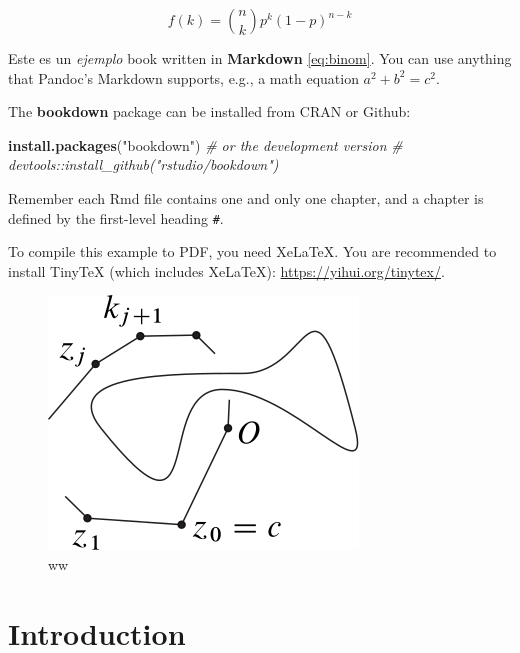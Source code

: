 \documentclass[12pt,]{book}
\newenvironment{Shaded}{\begin{snugshade}}{\end{snugshade}}
\newcommand{\CommentTok}[1]{\textcolor[rgb]{0.56,0.35,0.01}{\textit{#1}}}
\newcommand{\KeywordTok}[1]{\textcolor[rgb]{0.13,0.29,0.53}{\textbf{#1}}}
\newcommand{\NormalTok}[1]{#1}
\newcommand{\StringTok}[1]{\textcolor[rgb]{0.31,0.60,0.02}{#1}}
\theoremstyle{definition}
\theoremstyle{definition}
\theoremstyle{definition}
\theoremstyle{remark}
\begin{document}
\begin{equation} 
  f\left(k\right) = \binom{n}{k} p^k\left(1-p\right)^{n-k}
  \label{eq:binom}
\end{equation}

Este es un \emph{ejemplo} book written in \textbf{Markdown} \eqref{eq:binom}. You can use anything that Pandoc's Markdown supports, e.g., a math equation \(a^2 + b^2 = c^2\).

The \textbf{bookdown} package can be installed from CRAN or Github:

\begin{Shaded}
\begin{Highlighting}[]
\KeywordTok{install.packages}\NormalTok{(}\StringTok{"bookdown"}\NormalTok{)}
\CommentTok{# or the development version}
\CommentTok{# devtools::install_github("rstudio/bookdown")}
\end{Highlighting}
\end{Shaded}

Remember each Rmd file contains one and only one chapter, and a chapter is defined by the first-level heading \texttt{\#}.

To compile this example to PDF, you need XeLaTeX. You are recommended to install TinyTeX (which includes XeLaTeX): \url{https://yihui.org/tinytex/}.

\begin{figure}

{\centering \includegraphics{abstrac} 

}

\caption{ww}\label{fig:pressure3}
\end{figure}

\hypertarget{intro}{%
\chapter{Introduction}\label{intro}}
\end{document}
